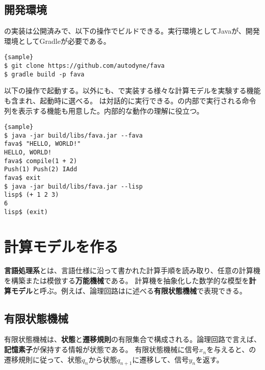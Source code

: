 \documentclass[10pt,a4paper]{book}
\begin{document}
\section{開発環境}

\fava{}の実装は公開済みで、以下の操作でビルドできる。実行環境としてJavaが、開発環境としてGradleが必要である。

\begin{Verbatim}{sample}
$ git clone https://github.com/autodyne/fava
$ gradle build -p fava
\end{Verbatim}

以下の操作で起動する。\fava{}以外にも、で実装する様々な計算モデルを実験する機能も含まれ、起動時に選べる。
\fava{}は対話的に実行できる。\fava{}の内部で実行される命令列を表示する機能も用意した。内部的な動作の理解に役立つ。

\begin{Verbatim}{sample}
$ java -jar build/libs/fava.jar --fava
fava$ "HELLO, WORLD!"
HELLO, WORLD!
fava$ compile(1 + 2)
Push(1) Push(2) IAdd
fava$ exit
$ java -jar build/libs/fava.jar --lisp
lisp$ (+ 1 2 3)
6
lisp$ (exit)
\end{Verbatim}

\chapter{計算モデルを作る\label{chap:automata}}

\textbf{言語処理系}とは、言語仕様に沿って書かれた計算手順を読み取り、任意の計算機を構築または模倣する\textbf{万能機械}である。
計算機を抽象化した数学的な模型を\textbf{計算モデル}と呼ぶ。例えば、論理回路はに述べる\textbf{有限状態機械}で表現できる。

\section{有限状態機械\label{sect:regex}}

有限状態機械は、\textbf{状態}と\textbf{遷移規則}の有限集合で構成される。論理回路で言えば、\textbf{記憶素子}が保持する情報が状態である。
有限状態機械に信号$x_n$を与えると、の遷移規則に従って、状態$q_n$から状態$q_{n+1}$に遷移して、信号$y_n$を返す。
\end{document}
